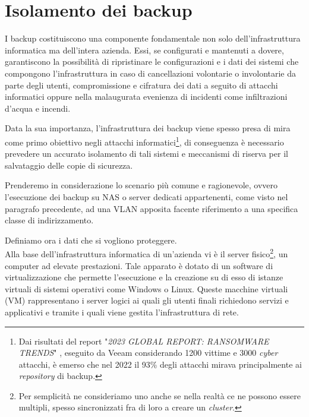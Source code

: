 \documentclass[target=bach,aauheader=]{thud}
\begin{document}
\section{Isolamento dei backup}
I backup costituiscono una componente fondamentale non solo dell'infrastruttura informatica ma dell'intera azienda. Essi, se configurati e mantenuti a dovere, garantiscono la possibilità di ripristinare le configurazioni e i dati dei sistemi che compongono l'infrastruttura in caso di cancellazioni volontarie o involontarie da parte degli utenti, compromissione e cifratura dei dati a seguito di attacchi informatici oppure nella malaugurata evenienza di incidenti come infiltrazioni d'acqua e incendi.

Data la sua importanza, l'infrastruttura dei backup viene spesso presa di mira come primo obiettivo negli attacchi informatici\footnote{Dai risultati del report "\textit{2023 GLOBAL REPORT: 
RANSOMWARE TRENDS}" \cite{veeam}, eseguito da Veeam considerando 1200 vittime e 3000 \textit{cyber} attacchi, è emerso che nel 2022 il 93\% degli attacchi mirava principalmente ai \textit{repository} di backup.}, di conseguenza è necessario prevedere un accurato isolamento di tali sistemi e meccanismi di riserva per il salvataggio delle copie di sicurezza.

Prenderemo in considerazione lo scenario più comune e ragionevole, ovvero l'esecuzione dei backup su NAS o server dedicati appartenenti, come visto nel paragrafo precedente, ad una VLAN apposita facente riferimento a una specifica classe di indirizzamento.

Definiamo ora i dati che si vogliono proteggere.
\\ Alla base dell'infrastruttura informatica di un'azienda vi è il server fisico\footnote{Per semplicità ne consideriamo uno anche se nella realtà ce ne possono essere multipli, spesso sincronizzati fra di loro a creare un \textit{cluster}.}, un computer ad elevate prestazioni. Tale apparato è dotato di un software di virtualizzazione che permette l'esecuzione e la creazione su di esso di istanze virtuali di sistemi operativi come Windows o Linux. Queste macchine virtuali (VM) rappresentano i server logici ai quali gli utenti finali richiedono servizi e applicativi e tramite i quali viene gestita l'infrastruttura di rete.
\end{document}
